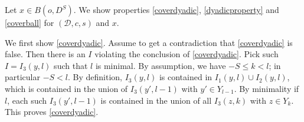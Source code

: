 Let $x\in B(o, D^S)$. We show properties
\eqref{coverdyadic},
\eqref{dyadicproperty} and
\eqref{coverball}
for $(\mathcal{D},c,s)$ and $x$.

We first show \eqref{coverdyadic}.
Assume to get a contradiction that \eqref{coverdyadic}
is false. Then there is an $I$ violating the conclusion of
\eqref{coverdyadic}. Pick such $I=I_3(y,l)$ such that $l$ is minimal.
{By assumption, we have $-S\le k<l$; in particular $-S<l$}.
By definition, $I_3(y, l)$ is contained in $I_1(y, l)\cup I_2(y, l)$, which is contained in the union of $I_3(y',l-1)$ with $y'\in Y_{l-1}$.
By minimality if $l$, each such $I_3(y',l-1)$ is contained in the union of
all $I_3(z,k)$ with $z\in Y_k$. This proves \eqref{coverdyadic}.

